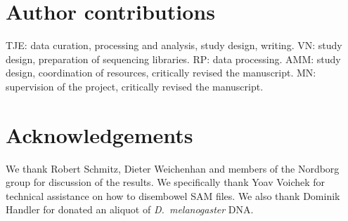 \documentclass[10pt,letterpaper,draft]{article}
\begin{document}
\section*{Author contributions}

TJE: data curation, processing and analysis, study design, writing.
VN: study design, preparation of sequencing libraries.
RP: data processing.
AMM: study design, coordination of resources, critically revised the manuscript.
MN: supervision of the project, critically revised the manuscript.

\section*{Acknowledgements}

We thank Robert Schmitz, Dieter Weichenhan and members of the Nordborg group for discussion of the results.
We specifically thank Yoav Voichek for technical assistance on how to disembowel SAM files.
We also thank Dominik Handler for donated an aliquot of \emph{D.~melanogaster} DNA.

\nolinenumbers

% 
\end{document}
